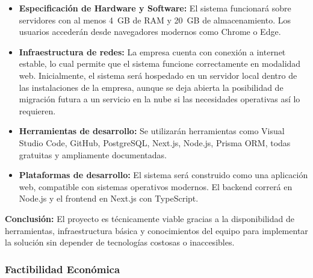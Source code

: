 \begin{itemize}
	\item \textbf{Especificación de Hardware y Software:} El sistema funcionará sobre servidores con al menos 4~GB de RAM y 20~GB de almacenamiento. Los usuarios accederán desde navegadores modernos como Chrome o Edge.

	\item \textbf{Infraestructura de redes:} La empresa cuenta con conexión a internet estable, lo cual permite que el sistema funcione correctamente en modalidad web. Inicialmente, el sistema será hospedado en un servidor local dentro de las instalaciones de la empresa, aunque se deja abierta la posibilidad de migración futura a un servicio en la nube si las necesidades operativas así lo requieren.

	\item \textbf{Herramientas de desarrollo:} Se utilizarán herramientas como Visual Studio Code, GitHub, PostgreSQL, Next.js, Node.js, Prisma ORM, todas gratuitas y ampliamente documentadas.

	\item \textbf{Plataformas de desarrollo:} El sistema será construido como una aplicación web, compatible con sistemas operativos modernos. El backend correrá en Node.js y el frontend en Next.js con TypeScript.
\end{itemize}

\textbf{Conclusión:} El proyecto es técnicamente viable gracias a la disponibilidad de herramientas, infraestructura básica y conocimientos del equipo para implementar la solución sin depender de tecnologías costosas o inaccesibles.

\subsubsection{Factibilidad Económica}

